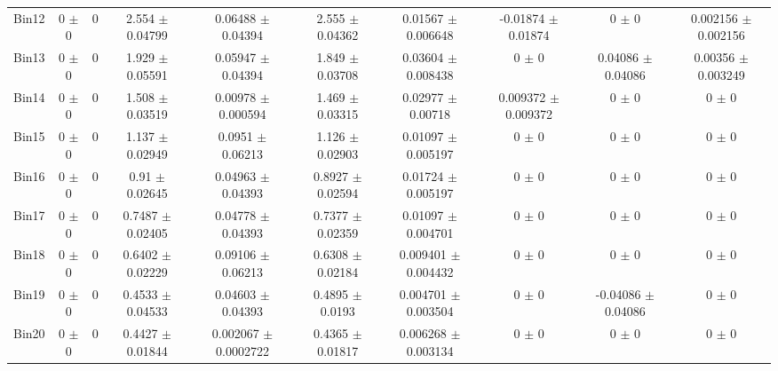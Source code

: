 \begin{tabular}{@{\extracolsep{4pt}}lccccccccc@{}}
     Bin12 & 0 $\pm$ 0 & 0 & 2.554 $\pm$ 0.04799 & 0.06488 $\pm$ 0.04394 & 2.555 $\pm$ 0.04362 & 0.01567 $\pm$ 0.006648 & -0.01874 $\pm$ 0.01874 & 0 $\pm$ 0 & 0.002156 $\pm$ 0.002156 \\ 
     Bin13 & 0 $\pm$ 0 & 0 & 1.929 $\pm$ 0.05591 & 0.05947 $\pm$ 0.04394 & 1.849 $\pm$ 0.03708 & 0.03604 $\pm$ 0.008438 & 0 $\pm$ 0 & 0.04086 $\pm$ 0.04086 & 0.00356 $\pm$ 0.003249 \\ 
     Bin14 & 0 $\pm$ 0 & 0 & 1.508 $\pm$ 0.03519 & 0.00978 $\pm$ 0.000594 & 1.469 $\pm$ 0.03315 & 0.02977 $\pm$ 0.00718 & 0.009372 $\pm$ 0.009372 & 0 $\pm$ 0 & 0 $\pm$ 0 \\ 
     Bin15 & 0 $\pm$ 0 & 0 & 1.137 $\pm$ 0.02949 & 0.0951 $\pm$ 0.06213 & 1.126 $\pm$ 0.02903 & 0.01097 $\pm$ 0.005197 & 0 $\pm$ 0 & 0 $\pm$ 0 & 0 $\pm$ 0 \\ 
     Bin16 & 0 $\pm$ 0 & 0 & 0.91 $\pm$ 0.02645 & 0.04963 $\pm$ 0.04393 & 0.8927 $\pm$ 0.02594 & 0.01724 $\pm$ 0.005197 & 0 $\pm$ 0 & 0 $\pm$ 0 & 0 $\pm$ 0 \\ 
     Bin17 & 0 $\pm$ 0 & 0 & 0.7487 $\pm$ 0.02405 & 0.04778 $\pm$ 0.04393 & 0.7377 $\pm$ 0.02359 & 0.01097 $\pm$ 0.004701 & 0 $\pm$ 0 & 0 $\pm$ 0 & 0 $\pm$ 0 \\ 
     Bin18 & 0 $\pm$ 0 & 0 & 0.6402 $\pm$ 0.02229 & 0.09106 $\pm$ 0.06213 & 0.6308 $\pm$ 0.02184 & 0.009401 $\pm$ 0.004432 & 0 $\pm$ 0 & 0 $\pm$ 0 & 0 $\pm$ 0 \\ 
     Bin19 & 0 $\pm$ 0 & 0 & 0.4533 $\pm$ 0.04533 & 0.04603 $\pm$ 0.04393 & 0.4895 $\pm$ 0.0193 & 0.004701 $\pm$ 0.003504 & 0 $\pm$ 0 & -0.04086 $\pm$ 0.04086 & 0 $\pm$ 0 \\ 
     Bin20 & 0 $\pm$ 0 & 0 & 0.4427 $\pm$ 0.01844 & 0.002067 $\pm$ 0.0002722 & 0.4365 $\pm$ 0.01817 & 0.006268 $\pm$ 0.003134 & 0 $\pm$ 0 & 0 $\pm$ 0 & 0 $\pm$ 0 \\ 
\hline\hline
  \end{tabular}
